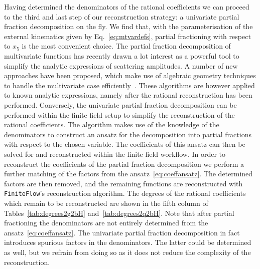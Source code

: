 \documentclass[main.tex]{subfiles}
\begin{document}
Having determined the denominators of the rational coefficients we can proceed to the third and last step of our reconstruction strategy:  a univariate partial fraction decomposition on the fly. We find that, with the parameterisation of the external kinematics given by Eq.~\eqref{eq:mtvardefs}, partial fractioning with respect to $x_5$ is the most convenient choice. 
The partial fraction decomposition of multivariate functions has recently drawn a lot interest as a powerful tool to simplify the analytic expressions of scattering amplitudes. A number of new approaches have been proposed, which make use of algebraic geometry techniques to handle the multivariate case efficiently~\cite{Leinartas:1978,Raichev:2012,Abreu:2019odu,Boehm:2020ijp,Heller:2021qkz}. These algorithms are however applied to known analytic expressions, namely after the rational reconstruction has been performed. Conversely, the univariate partial fraction decomposition can be performed within the finite field setup to simplify the reconstruction of the rational coefficients.
The algorithm makes use of the knowledge of the denominators to construct an ansatz for the decomposition into partial fractions with respect to the chosen variable. The coefficients of this ansatz can then be solved for and reconstructed within the finite field workflow. In order to reconstruct the coefficients of the partial fraction decomposition we perform a further matching of the factors from the ansatz~\eqref{eq:coeffansatz}. The determined factors are then removed, and the remaining functions are reconstructed with \texttt{FiniteFlow}'s reconstruction algorithm. The degrees of the rational coefficients which remain to be reconstructed are shown in the fifth column of Tables~\ref{tab:degrees2g2bH} and~\ref{tab:degrees2q2bH}. Note that after partial fractioning the denominators are not entirely determined from the ansatz~\eqref{eq:coeffansatz}. The univariate partial fraction decomposition in fact introduces spurious factors in the denominators. The latter could be determined as well, but we refrain from doing so as it does not reduce the complexity of the reconstruction.
\end{document}
